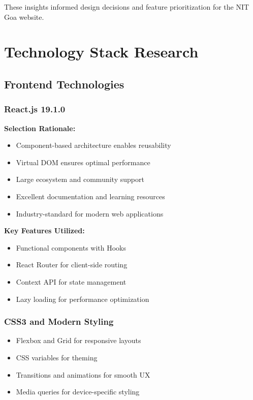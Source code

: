 \documentclass[12pt,a4paper]{report}
\begin{document}
These insights informed design decisions and feature prioritization for the NIT Goa website.

\section{Technology Stack Research}

\subsection*{Frontend Technologies}

\subsubsection*{React.js 19.1.0}
\textbf{Selection Rationale:}
\begin{itemize}
    \item Component-based architecture enables reusability
    \item Virtual DOM ensures optimal performance
    \item Large ecosystem and community support
    \item Excellent documentation and learning resources
    \item Industry-standard for modern web applications
\end{itemize}

\item\textbf{Key Features Utilized:}
\begin{itemize}
    \item Functional components with Hooks
    \item React Router for client-side routing
    \item Context API for state management
    \item Lazy loading for performance optimization
\end{itemize}

\subsubsection*{CSS3 and Modern Styling}
\begin{itemize}
    \item Flexbox and Grid for responsive layouts
    \item CSS variables for theming
    \item Transitions and animations for smooth UX
    \item Media queries for device-specific styling
\end{itemize}
\end{document}
